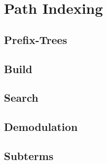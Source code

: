 
\section{Path Indexing}
\subsection{Prefix-Trees}

%	

\subsection{Build}
\begin{frame}
	
\end{frame}

\subsection{Search}
\begin{frame}
	
\end{frame}

\subsection{Demodulation}
\begin{frame}
	
\end{frame}

\subsection{Subterms}
\begin{frame}
	
\end{frame}


